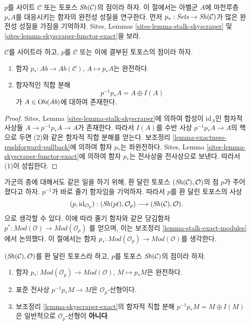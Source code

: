 \noindent
$p$를 사이트 $\mathcal{C}$ 또는 토포스 $\mathop{\mathit{Sh}}\nolimits(\mathcal{C})$의 점이라 하자.
이 절에서는 아벨군 $A$에 마천루층 $p_*A$를 대응시키는 함자의 완전성
성질을 연구한다. 먼저 $p_* : \textit{Sets} \to \mathop{\mathit{Sh}}\nolimits(\mathcal{C})$가
많은 완전성 성질을 가짐을 기억하자. Sites, Lemmas
\ref{sites-lemma-stalk-skyscraper} 및
\ref{sites-lemma-skyscraper-functor-exact}을 보라.

\begin{lemma}
\label{lemma-skyscraper-exact}
$\mathcal{C}$를 사이트라 하고, $p$를 $\mathcal{C}$ 또는 이에 결부된
토포스의 점이라 하자.
\begin{enumerate}
\item 함자 $p_* : \textit{Ab} \to \textit{Ab}(\mathcal{C})$,
$A \mapsto p_*A$는 완전하다.
\item 함자적인 직합 분해
$$
p^{-1}p_*A = A \oplus I(A)
$$
가 $A \in \mathop{\mathrm{Ob}}\nolimits(\textit{Ab})$에 대하여 존재한다.
\end{enumerate}
\end{lemma}

\begin{proof}
Sites, Lemma \ref{sites-lemma-stalk-skyscraper}에 의하여 합성이
$\text{id}_A$인 함자적 사상들 $A \to p^{-1}p_*A \to A$가 존재한다.
따라서 $I(A)$를 수반 사상 $p^{-1}p_*A \to A$의 핵으로 두면 (2)와 같은
함자적 직합 분해를 얻는다. 보조정리
\ref{lemma-exactness-pushforward-pullback}에 의하여 함자 $p_*$는
좌완전하다. Sites, Lemma \ref{sites-lemma-skyscraper-functor-exact}에
의하여 함자 $p_*$는 전사상을 전사상으로 보낸다. 따라서 (1)이 성립한다.
\end{proof}

\noindent
가군의 층에 대해서도 같은 일을 하기 위해, 환 달린 토포스
$(\mathop{\mathit{Sh}}\nolimits(\mathcal{C}), \mathcal{O})$의 점 $p$가 주어졌다고 하자.
$p^{-1}$가 바로 줄기 함자임을 기억하자. 따라서 $p$를 환 달린
토포스의 사상
$$
(p, \text{id}_{\mathcal{O}_p}) :
(\mathop{\mathit{Sh}}\nolimits(pt), \mathcal{O}_p)
\longrightarrow
(\mathop{\mathit{Sh}}\nolimits(\mathcal{C}), \mathcal{O}).
$$
으로 생각할 수 있다. 이에 따라 줄기 함자와 같은 당김함자
$p^* : \textit{Mod}(\mathcal{O}) \to \textit{Mod}(\mathcal{O}_p)$
를 얻으며, 이는 보조정리 \ref{lemma-stalk-exact-modules}에서 논의했다.
이 절에서는 함자
$p_* : \textit{Mod}(\mathcal{O}_p) \to \textit{Mod}(\mathcal{O})$를 생각한다.

\begin{lemma}
\label{lemma-skyscraper-modules-exact}
$(\mathop{\mathit{Sh}}\nolimits(\mathcal{C}), \mathcal{O})$를 환 달린 토포스라 하고,
$p$를 토포스 $\mathop{\mathit{Sh}}\nolimits(\mathcal{C})$의 점이라 하자.
\begin{enumerate}
\item 함자
$p_* : \textit{Mod}(\mathcal{O}_p) \to \textit{Mod}(\mathcal{O})$,
$M \mapsto p_*M$은 완전하다.
\item 표준 전사상 $p^{-1}p_*M \to M$은 $\mathcal{O}_p$-선형이다.
\item 보조정리 \ref{lemma-skyscraper-exact}의 함자적 직합 분해
$p^{-1}p_*M = M \oplus I(M)$은 일반적으로 $\mathcal{O}_p$-선형이
{\bf 아니다}.
\end{enumerate}
\end{lemma}

